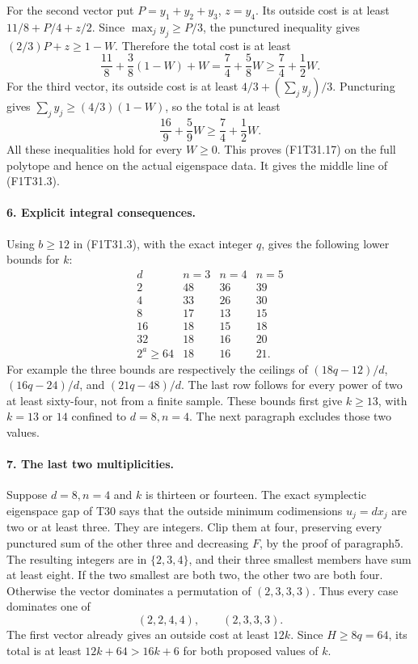 For the second vector put \(P=y_1+y_2+y_3\), \(z=y_4\).
Its outside cost is at least \(11/8+P/4+z/2\).
Since \(\max_jy_j\ge P/3\), the punctured inequality gives
\((2/3)P+z\ge1-W\). Therefore the total cost is at least
\[
 \frac{11}{8}+\frac38(1-W)+W
             =\frac74+\frac58W
             \ge\frac74+\frac12W.
\]
For the third vector, its outside cost is at least
\(4/3+(\sum_jy_j)/3\). Puncturing gives
\(\sum_jy_j\ge(4/3)(1-W)\), so the total is at least
\[
             \frac{16}{9}+\frac59W
                 \ge\frac74+\frac12W.
\]
All these inequalities hold for every \(W\ge0\).
This proves (F1T31.17) on the full polytope and hence
on the actual eigenspace data. It gives the middle
line of (F1T31.3).

\paragraph{6. Explicit integral consequences.}
Using \(b\ge12\) in (F1T31.3), with the exact
integer \(q\), gives the following lower bounds for \(k\):
\[
 \begin{array}{c|ccc}
 d&n=3&n=4&n=5\\ \hline
 2&48&36&39\\
 4&33&26&30\\
 8&17&13&15\\
 16&18&15&18\\
 32&18&16&20\\
 2^a\ge64&18&16&21.
 \end{array}
 \tag{F1T31.20}
\]
For example the three bounds are respectively the
ceilings of \((18q-12)/d\), \((16q-24)/d\), and
\((21q-48)/d\). The last row follows for every power
of two at least sixty-four, not from a finite sample.
These bounds first give \(k\ge13\), with \(k=13\)
or \(14\) confined to \(d=8,n=4\). The next paragraph
excludes those two values.

\paragraph{7. The last two multiplicities.}
Suppose \(d=8,n=4\) and \(k\) is thirteen or fourteen.
The exact symplectic eigenspace gap of T30 says that
the outside minimum codimensions \(u_j=dx_j\) are
two or at least three. They are integers. Clip them
at four, preserving every punctured sum of the other
three and decreasing \(F\), by the proof of paragraph5.
The resulting integers are in \(\{2,3,4\}\), and their
three smallest members have sum at least eight.
If the two smallest are both two, the other two are
both four. Otherwise the vector dominates a permutation
of \((2,3,3,3)\). Thus every case dominates one of
\[
                         (2,2,4,4),\qquad(2,3,3,3).
 \tag{F1T31.21}
\]
The first vector already gives an outside cost at least
\(12k\). Since \(H\ge8q=64\), its total is at least
\(12k+64>16k+6\) for both proposed values of \(k\).

